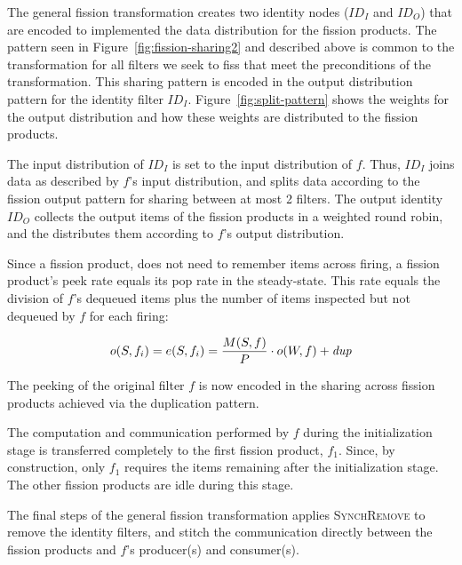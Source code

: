 The general fission transformation creates two identity nodes ($ID_I$
and $ID_O$) that are encoded to implemented the data distribution for
the fission products.  The pattern seen in
Figure~\ref{fig:fission-sharing2} and described above is common to the
transformation for all filters we seek to fiss that meet the
preconditions of the transformation.  This sharing pattern is encoded
in the output distribution pattern for the identity filter $ID_I$.
Figure~\ref{fig:split-pattern} shows the weights for the output
distribution and how these weights are distributed to the fission
products.

The input distribution of $ID_I$ is set to the input distribution of
$f$.  Thus, $ID_I$ joins data as described by $f$'s input
distribution, and splits data according to the fission output pattern
for sharing between at most 2 filters.  The output identity $ID_O$
collects the output items of the fission products in a weighted round
robin, and the distributes them according to $f$'s output distribution.

Since a fission product, does not need to remember items across
firing, a fission product's peek rate equals its pop rate in the
steady-state.  This rate equals the division of $f$'s dequeued
items plus the number of items inspected but not dequeued by $f$ for
each firing:   

\[ o(S,f_i) = e(S, f_i) = \frac{M(S, f)}{P} \cdot o(W, f) + \mbox{\it dup} \]

\noindent The peeking of the original filter $f$ is now encoded in
the sharing across fission products achieved via the duplication
pattern.

The computation and communication performed by $f$ during the
initialization stage is transferred completely to the first fission
product, $f_1$.  Since, by construction, only $f_1$ requires the items
remaining after the initialization stage.  The other fission products
are idle during this stage.

The final steps of the general fission transformation applies
\textsc{SynchRemove} to remove the identity filters, and stitch the
communication directly between the fission products and $f$'s
producer(s) and consumer(s).
 

